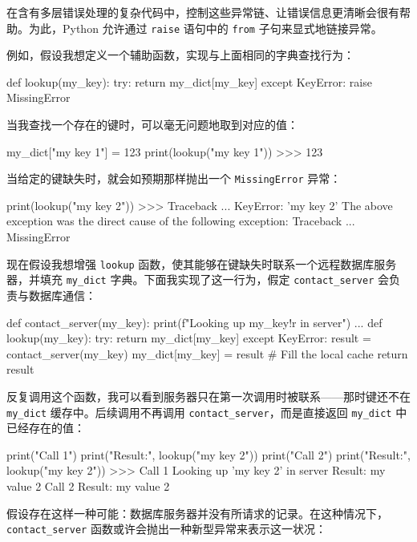 在含有多层错误处理的复杂代码中，控制这些异常链、让错误信息更清晰会很有帮助。为此，Python 允许通过 \texttt{raise} 语句中的 \texttt{from} 子句来显式地链接异常。

例如，假设我想定义一个辅助函数，实现与上面相同的字典查找行为：

\begin{codebox}[python]
def lookup(my_key):
    try:
        return my_dict[my_key]
    except KeyError:
        raise MissingError
\end{codebox}

当我查找一个存在的键时，可以毫无问题地取到对应的值：

\begin{codebox}[python]
my_dict["my key 1"] = 123
print(lookup("my key 1"))
>>>
123
\end{codebox}

当给定的键缺失时，就会如预期那样抛出一个 \texttt{MissingError} 异常：

\begin{codebox}[python]
print(lookup("my key 2"))
>>>
Traceback ...
KeyError: 'my key 2'
The above exception was the direct cause of the following
exception:
Traceback ...
MissingError
\end{codebox}

现在假设我想增强 \texttt{lookup} 函数，使其能够在键缺失时联系一个远程数据库服务器，并填充 \texttt{my\_dict} 字典。下面我实现了这一行为，假定 \texttt{contact\_server} 会负责与数据库通信：

\begin{codebox}[python]
def contact_server(my_key):
    print(f"Looking up {my_key!r} in server")
    ...
def lookup(my_key):
    try:
        return my_dict[my_key]
    except KeyError:
        result = contact_server(my_key)
        my_dict[my_key] = result  # Fill the local cache
        return result
\end{codebox}

反复调用这个函数，我可以看到服务器只在第一次调用时被联系——那时键还不在 \texttt{my\_dict} 缓存中。后续调用不再调用 \texttt{contact\_server}，而是直接返回 \texttt{my\_dict} 中已经存在的值：

\begin{codebox}[python]
print("Call 1")
print("Result:", lookup("my key 2"))
print("Call 2")
print("Result:", lookup("my key 2"))
>>>
Call 1
Looking up 'my key 2' in server
Result: my value 2
Call 2
Result: my value 2
\end{codebox}

假设存在这样一种可能：数据库服务器并没有所请求的记录。在这种情况下，\texttt{contact\_server} 函数或许会抛出一种新型异常来表示这一状况：


